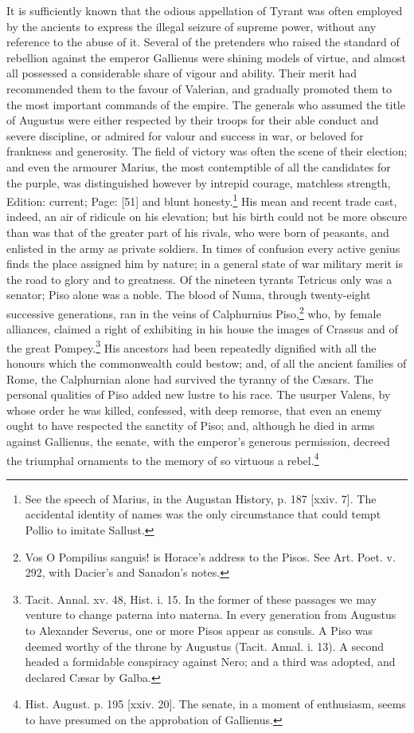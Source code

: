 It is sufficiently known that the odious appellation of Tyrant was often employed by the ancients to express the illegal seizure of supreme power, without any reference to the abuse of it. Several of the pretenders who raised the standard of rebellion against the emperor Gallienus were shining models of virtue, and almost all possessed a considerable share of vigour and ability. Their merit had recommended them to the favour of Valerian, and gradually promoted them to the most important commands of the empire. The generals who assumed the title of Augustus were either respected by their troops for their able conduct and severe discipline, or admired for valour and success in war, or beloved for frankness and generosity. The field of victory was often the scene of their election; and even the armourer Marius, the most contemptible of all the candidates for the purple, was distinguished however by intrepid courage, matchless strength, Edition: current; Page: [51] and blunt honesty.\footnote{See the speech of Marius, in the Augustan History, p. 187 [xxiv. 7]. The accidental identity of names was the only circumstance that could tempt Pollio to imitate Sallust.} His mean and recent trade cast, indeed, an air of ridicule on his elevation; but his birth could not be more obscure than was that of the greater part of his rivals, who were born of peasants, and enlisted in the army as private soldiers. In times of confusion every active genius finds the place assigned him by nature; in a general state of war military merit is the road to glory and to greatness. Of the nineteen tyrants Tetricus only was a senator; Piso alone was a noble. The blood of Numa, through twenty-eight successive generations, ran in the veins of Calphurnius Piso,\footnote{Vos O Pompilius sanguis! is Horace\texthebrew{}’s address to the Pisos. See Art. Poet. v. 292, with Dacier\texthebrew{}’s and Sanadon\texthebrew{}’s notes.} who, by female alliances, claimed a right of exhibiting in his house the images of Crassus and of the great Pompey.\footnote{Tacit. Annal. xv. 48, Hist. i. 15. In the former of these passages we may venture to change paterna into materna. In every generation from Augustus to Alexander Severus, one or more Pisos appear as consuls. A Piso was deemed worthy of the throne by Augustus (Tacit. Annal. i. 13). A second headed a formidable conspiracy against Nero; and a third was adopted, and declared Cæsar by Galba.} His ancestors had been repeatedly dignified with all the honours which the commonwealth could bestow; and, of all the ancient families of Rome, the Calphurnian alone had survived the tyranny of the Cæsars. The personal qualities of Piso added new lustre to his race. The usurper Valens, by whose order he was killed, confessed, with deep remorse, that even an enemy ought to have respected the sanctity of Piso; and, although he died in arms against Gallienus, the senate, with the emperor\texthebrew{}’s generous permission, decreed the triumphal ornaments to the memory of so virtuous a rebel.\footnote{Hist. August. p. 195 [xxiv. 20]. The senate, in a moment of enthusiasm, seems to have presumed on the approbation of Gallienus.}


